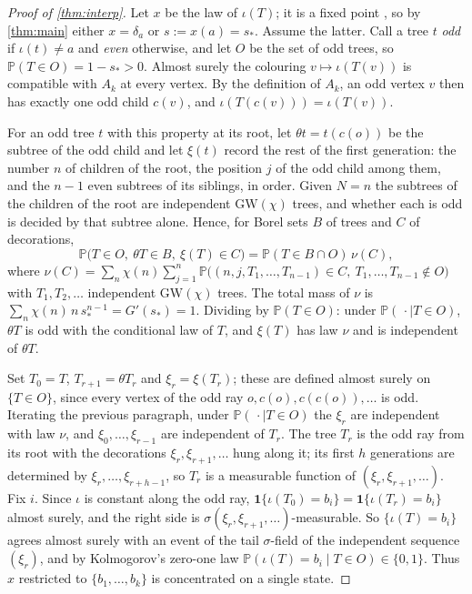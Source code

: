 \documentclass[11pt]{amsart}
\theoremstyle{remark}
\newcommand{\GW}{\mathrm{GW}}
\begin{document}
\begin{proof}[Proof of \cref{thm:interp}]
Let $x$ be the law of $\iota(T)$; it is a fixed point \cite[Section~1.5]{JPS}, so by \cref{thm:main} either $x=\delta_a$ or $s:=x(a)=s_*$. Assume the latter. Call a tree $t$ \emph{odd} if $\iota(t)\ne a$ and \emph{even} otherwise, and let $O$ be the set of odd trees, so $\mathbb P(T\in O)=1-s_*>0$. Almost surely the colouring $v\mapsto\iota(T(v))$ is compatible with $A_k$ at every vertex. By the definition of $A_k$, an odd vertex $v$ then has exactly one odd child $c(v)$, and $\iota(T(c(v)))=\iota(T(v))$.

For an odd tree $t$ with this property at its root, let $\theta t=t(c(o))$ be the subtree of the odd child and let $\xi(t)$ record the rest of the first generation: the number $n$ of children of the root, the position $j$ of the odd child among them, and the $n-1$ even subtrees of its siblings, in order. Given $N=n$ the subtrees of the children of the root are independent $\GW(\chi)$ trees, and whether each is odd is decided by that subtree alone. Hence, for Borel sets $B$ of trees and $C$ of decorations,
\[
\mathbb P\bigl(T\in O,\ \theta T\in B,\ \xi(T)\in C\bigr)=\mathbb P(T\in B\cap O)\,\nu(C),
\]
where $\nu(C)=\sum_n\chi(n)\sum_{j=1}^{n}\mathbb P\bigl((n,j,T_1,\dots,T_{n-1})\in C,\ T_1,\dots,T_{n-1}\notin O\bigr)$ with $T_1,T_2,\dots$ independent $\GW(\chi)$ trees. The total mass of $\nu$ is $\sum_n\chi(n)\,n\,s_*^{n-1}=G'(s_*)=1$. Dividing by $\mathbb P(T\in O)$: under $\mathbb P(\,\cdot\mid T\in O)$, $\theta T$ is odd with the conditional law of $T$, and $\xi(T)$ has law $\nu$ and is independent of $\theta T$.

Set $T_0=T$, $T_{r+1}=\theta T_r$ and $\xi_r=\xi(T_r)$; these are defined almost surely on $\{T\in O\}$, since every vertex of the odd ray $o,c(o),c(c(o)),\dots$ is odd. Iterating the previous paragraph, under $\mathbb P(\,\cdot\mid T\in O)$ the $\xi_r$ are independent with law $\nu$, and $\xi_0,\dots,\xi_{r-1}$ are independent of $T_r$. The tree $T_r$ is the odd ray from its root with the decorations $\xi_r,\xi_{r+1},\dots$ hung along it; its first $h$ generations are determined by $\xi_r,\dots,\xi_{r+h-1}$, so $T_r$ is a measurable function of $(\xi_r,\xi_{r+1},\dots)$. Fix $i$. Since $\iota$ is constant along the odd ray, $\mathbf 1\{\iota(T_0)=b_i\}=\mathbf 1\{\iota(T_r)=b_i\}$ almost surely, and the right side is $\sigma(\xi_r,\xi_{r+1},\dots)$-measurable. So $\{\iota(T)=b_i\}$ agrees almost surely with an event of the tail $\sigma$-field of the independent sequence $(\xi_r)$, and by Kolmogorov's zero-one law $\mathbb P(\iota(T)=b_i\mid T\in O)\in\{0,1\}$. Thus $x$ restricted to $\{b_1,\dots,b_k\}$ is concentrated on a single state.
\end{proof}
\end{document}
